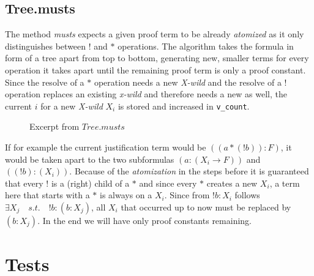 \subsection{Tree.musts}
The method \emph{musts} expects a given proof term to be already \emph{atomized} as it only distinguishes between $!$ and $*$ operations.
The algorithm takes the formula in form of a tree apart from top to bottom, generating new, smaller terms for every operation it takes apart until the remaining proof term is only a proof constant. Since the resolve of a $*$ operation needs a new \emph{X-wild} and the resolve of a $!$ operation replaces an existing \emph{x-wild} and therefore needs a new as well, the current $i$ for a new \emph{X-wild} $X_i$ is stored and increased in \texttt{v\_count}.

\begin{figure}[H]
    \vspace{-10pt}
	
	\vspace{-10pt}
	\caption{Excerpt from $Tree.musts$}
	\vspace{-10pt}
\end{figure}

If for example the current justification term would be $((a*(!b)):F)$, it would be taken apart to the two subformulas $(a:(X_i\rightarrow F))$ and $((!b):(X_i))$. Because of the \emph{atomization} in the steps before it is guaranteed that every $!$ is a (right) child of a  $*$ and since every $*$ creates a new $X_i$, a term here that starts with a $*$ is always on a $X_i$. Since from $!b:X_i$ follows $\exists X_j \quad s.t. \quad !b:(b:X_j)$, all $X_i$ that occurred up to now must be replaced by $(b:X_j)$. In the end we will have only proof constants remaining.


\section{Tests}
